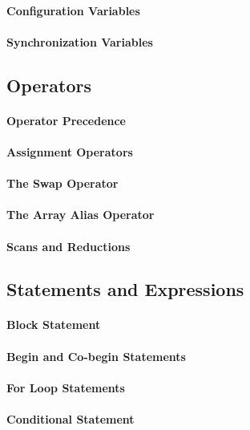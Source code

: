 \paragraph{Configuration Variables}
\paragraph{Synchronization Variables}

\subsection{Operators}
\paragraph{Operator Precedence}
\paragraph{Assignment Operators}
\paragraph{The Swap Operator}
\paragraph{The Array Alias Operator}
\paragraph{Scans and Reductions}

\subsection{Statements and Expressions}
\paragraph{Block Statement}
\paragraph{Begin and Co-begin Statements}
\paragraph{For Loop Statements}
\paragraph{Conditional Statement}
